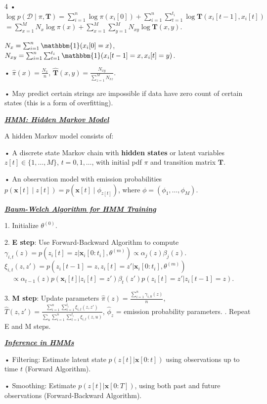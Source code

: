 \documentclass[12pt]{article}
\newcommand{\bulletPoint}[1]{\underline{\textit{\textbf{#1}}}}
\begin{document}
\begin{multicols*}{4}
• $\log p(\mathcal{D} \mid \pi, \mathbf{T}) = \sum_{i=1}^{n} \log \pi(x_i[0]) + \sum_{i=1}^{n} \sum_{t=1}^{t_i} \log \mathbf{T}(x_i[t-1], x_i[t])$
$= \sum_{x=1}^{M} N_x \log \pi(x) + \sum_{x=1}^{M} \sum_{y=1}^{M} N_{xy} \log \mathbf{T}(x, y)$. 

$N_x = \sum_{i=1}^{n} \mathbbm{1}(x_i[0] = x)$, $N_{xy} = \sum_{i=1}^{n} \sum_{t=1}^{t_i} \mathbbm{1}(x_i[t-1] = x, x_i[t] = y)$. 

• $\hat{\pi}(x) = \frac{N_x}{n}$, $\hat{\mathbf{T}}(x, y) = \frac{N_{xy}}{\sum_{z=1}^{M} N_{xz}}$. 
  
• May predict certain strings are impossible if data have zero count of certain states (this is a form of overfitting).

\bulletPoint{HMM: Hidden Markov Model}\quad

A hidden Markov model consists of:

• A discrete state Markov chain with \textbf{hidden states} or latent variables $z[t] \in \{1, \dots, M\}$, $t = 0,1,\dots$, with initial pdf $\pi$ and transition matrix $\mathbf{T}$.

• An observation model with emission probabilities $p(\mathbf{x}[t] \mid z[t]) = p(\mathbf{x}[t] \mid \phi_{z[t]})$, where $\phi = (\phi_1, \dots, \phi_M)$. 


\bulletPoint{Baum-Welch Algorithm for HMM Training}\quad

1. Initialize $\theta^{(0)}$.

2. \textbf{E step}: Use Forward-Backward Algorithm to compute
    $\gamma_{i,t}(z) = p(z_i[t] = z | \mathbf{x}_i[0:t_i], \theta^{(m)}) \propto \alpha_j(z) \beta_j(z)$. 
    $\xi_{i,t}(z,z') = p(z_i[t-1] = z, z_i[t] = z' | \mathbf{x}_i[0:t_i], \theta^{(m)})$
    $\quad \propto \alpha_{t-1}(z) p(\mathbf{x}_i[t] | z_i[t]=z') \beta_t(z') p(z_i[t] = z' | z_i[t-1] = z)$. 

3. \textbf{M step}: Update parameters
    $\hat{\pi}(z) = \frac{\sum_{i=1}^{n} \gamma_{i,0}(z)}{n}$, 
    $\hat{T}(z,z') = \frac{\sum_{i=1}^{n} \sum_{t=1}^{t_i} \xi_{i,t}(z,z')}{\sum_u \sum_{i=1}^{n} \sum_{t=1}^{t_i} \xi_{i,t}(z,u)}$, 
    $\hat{\phi}_z$ = emission probability parameters. . Repeat E and M steps.
  
\bulletPoint{Inference in HMMs}\quad

• Filtering: Estimate latent state $p(z[t] | \mathbf{x}[0:t])$ using observations up to time $t$ ({Forward Algorithm}). 

• Smoothing: Estimate $p(z[t] | \mathbf{x}[0:T])$, using both past and future observations ({Forward-Backward Algorithm}). 


\end{multicols*}
\end{document}
